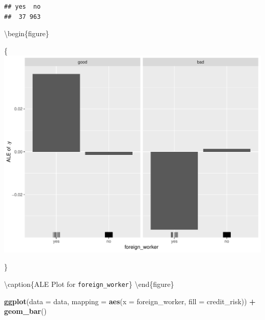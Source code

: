 \documentclass[
]{article}
\newenvironment{Shaded}{\begin{snugshade}}{\end{snugshade}}
\newcommand{\DataTypeTok}[1]{\textcolor[rgb]{0.13,0.29,0.53}{#1}}
\newcommand{\KeywordTok}[1]{\textcolor[rgb]{0.13,0.29,0.53}{\textbf{#1}}}
\newcommand{\NormalTok}[1]{#1}
\newcommand{\OperatorTok}[1]{\textcolor[rgb]{0.81,0.36,0.00}{\textbf{#1}}}
\newcommand{\StringTok}[1]{\textcolor[rgb]{0.31,0.60,0.02}{#1}}
\begin{document}
\begin{Shaded}
\end{Shaded}

\begin{verbatim}
## yes  no 
##  37 963
\end{verbatim}

\begin{Shaded}
\end{Shaded}

\textbackslash begin\{figure\}

\{\centering \includegraphics[width=0.8\linewidth]{plots/ale_foreign_worker}

\}

\textbackslash caption\{ALE Plot for \texttt{foreign\_worker}\}\label{fig:ale-foreign-worker}
\textbackslash end\{figure\}

\begin{Shaded}
\begin{Highlighting}[]
\KeywordTok{ggplot}\NormalTok{(}\DataTypeTok{data =}\NormalTok{ data, }\DataTypeTok{mapping =} \KeywordTok{aes}\NormalTok{(}\DataTypeTok{x =}\NormalTok{ foreign_worker, }\DataTypeTok{fill =}\NormalTok{ credit_risk)) }\OperatorTok{+}\StringTok{ }\KeywordTok{geom_bar}\NormalTok{()}
\end{Highlighting}
\end{Shaded}
\end{document}

